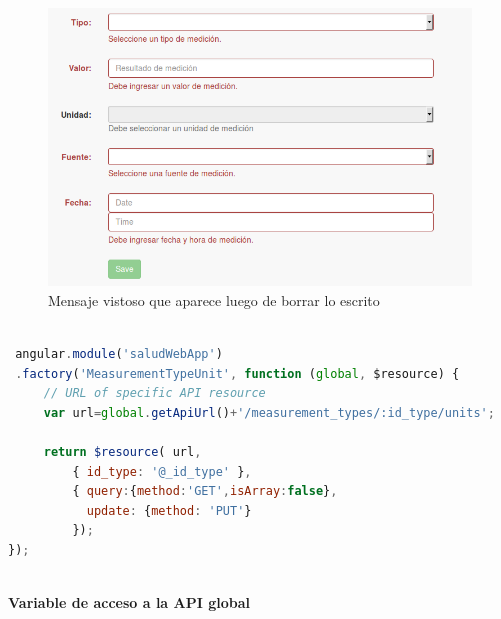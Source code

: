 \begin{figure}[h!]
  \centering
  \includegraphics[width=.8\textwidth]{img/3-escribir_borrar}
  \caption{Mensaje vistoso que aparece luego de borrar lo escrito}
  \label{msj_escribir_borrar}
\end{figure}

\clearpage

\begin{lstlisting}[language=JavaScript, caption= recurso que solicita las unidades de un tipo de medición específico, label=type_unit]

 angular.module('saludWebApp')                                                   
 .factory('MeasurementTypeUnit', function (global, $resource) {                  
     // URL of specific API resource                                             
     var url=global.getApiUrl()+'/measurement_types/:id_type/units';             
                                                                                 
     return $resource( url,                                                      
         { id_type: '@_id_type' },                                                        
         { query:{method:'GET',isArray:false},                                   
           update: {method: 'PUT'}                                               
         });                                                                     
}); 
                                                                            
\end{lstlisting}



\textbf{Variable de acceso a la API global}

